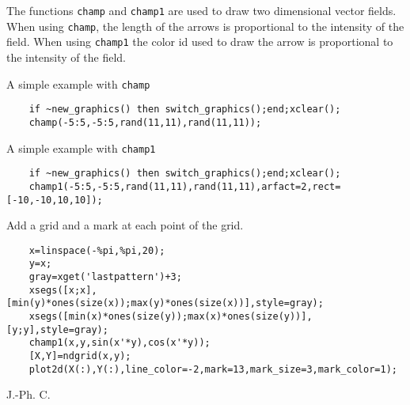 \begin{mandescription}
  The functions \verb!champ! and \verb!champ1! are used to draw two dimensional
  vector fields. When using \verb!champ!, the length of the arrows is proportional to the intensity of the field.
  When using \verb!champ1! the color id used to draw the arrow is proportional to the intensity of the field.
\end{mandescription}
\begin{examples}
  \noindent A simple example with \verb!champ!
  \begin{Verbatim}
    if ~new_graphics() then switch_graphics();end;xclear();
    champ(-5:5,-5:5,rand(11,11),rand(11,11));
  \end{Verbatim}
  \noindent A simple example with \verb!champ1!
  \begin{Verbatim}
    if ~new_graphics() then switch_graphics();end;xclear();
    champ1(-5:5,-5:5,rand(11,11),rand(11,11),arfact=2,rect=[-10,-10,10,10]);
  \end{Verbatim}

  \noindent Add a grid and a mark at each point of the grid.
  \begin{Verbatim}
    x=linspace(-%pi,%pi,20);
    y=x;
    gray=xget('lastpattern')+3;
    xsegs([x;x],[min(y)*ones(size(x));max(y)*ones(size(x))],style=gray);
    xsegs([min(x)*ones(size(y));max(x)*ones(size(y))],[y;y],style=gray);
    champ1(x,y,sin(x'*y),cos(x'*y));
    [X,Y]=ndgrid(x,y);
    plot2d(X(:),Y(:),line_color=-2,mark=13,mark_size=3,mark_color=1);
  \end{Verbatim}

\end{examples}
\begin{authors}
  J.-Ph. C.
\end{authors}
